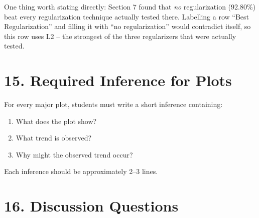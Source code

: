 \documentclass[10pt]{article}
\begin{document}
One thing worth stating directly: Section 7 found that \emph{no} regularization
(92.80\%) beat every regularization technique actually tested there. Labelling
a row ``Best Regularization'' and filling it with ``no regularization'' would
contradict itself, so this row uses L2 -- the strongest of the three
regularizers that were actually tested.

\section*{15. Required Inference for Plots}

For every major plot, students must write a short inference containing:

\begin{enumerate}
\item What does the plot show?
\item What trend is observed?
\item Why might the observed trend occur?
\end{enumerate}

Each inference should be approximately 2--3 lines.

\section*{16. Discussion Questions}
\end{document}
